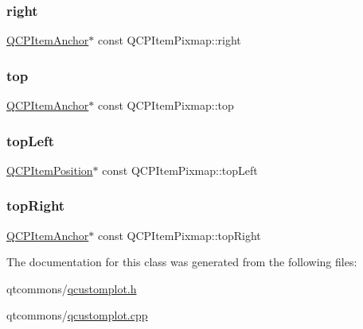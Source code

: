 \mbox{\label{class_q_c_p_item_pixmap_ac9c0fd231f9e285765978a05d13f8280}} 
\subsubsection{\texorpdfstring{right}{right}}
{\footnotesize\ttfamily \mbox{\hyperlink{class_q_c_p_item_anchor}{Q\+C\+P\+Item\+Anchor}}$\ast$ const Q\+C\+P\+Item\+Pixmap\+::right}

\mbox{\label{class_q_c_p_item_pixmap_af7a156590b1d59ab21b453c430c56a7c}} 
\subsubsection{\texorpdfstring{top}{top}}
{\footnotesize\ttfamily \mbox{\hyperlink{class_q_c_p_item_anchor}{Q\+C\+P\+Item\+Anchor}}$\ast$ const Q\+C\+P\+Item\+Pixmap\+::top}

\mbox{\label{class_q_c_p_item_pixmap_a43c281ef6ad46f3cf04f365289abe51a}} 
\subsubsection{\texorpdfstring{topLeft}{topLeft}}
{\footnotesize\ttfamily \mbox{\hyperlink{class_q_c_p_item_position}{Q\+C\+P\+Item\+Position}}$\ast$ const Q\+C\+P\+Item\+Pixmap\+::top\+Left}

\mbox{\label{class_q_c_p_item_pixmap_a72eabd0010be41a4ec1b22aa983d2aa1}} 
\subsubsection{\texorpdfstring{topRight}{topRight}}
{\footnotesize\ttfamily \mbox{\hyperlink{class_q_c_p_item_anchor}{Q\+C\+P\+Item\+Anchor}}$\ast$ const Q\+C\+P\+Item\+Pixmap\+::top\+Right}



The documentation for this class was generated from the following files\+:\begin{DoxyCompactItemize}
\item 
qtcommons/\mbox{\hyperlink{qcustomplot_8h}{qcustomplot.\+h}}\item 
qtcommons/\mbox{\hyperlink{qcustomplot_8cpp}{qcustomplot.\+cpp}}\end{DoxyCompactItemize}
